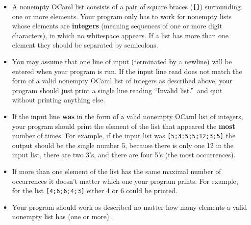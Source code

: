 \documentclass[11pt]{article}
\begin{document}
\begin{enumerate}
          \vspace{-2.5mm}

          \begin{itemize}

            \addtolength{\itemsep}{0mm}

            \item A nonempty OCaml list consists of a pair of square braces
                  (\texttt{[]}) surrounding one or more elements.  Your
                  program only has to work for nonempty lists whose elements
                  are \textbf{integers} (meaning sequences of one or more
                  digit characters), in which no whitespace appears.  If a
                  list has more than one element they should be separated by
                  semicolons.

            \item You may assume that one line of input (terminated by a
                  newline) will be entered when your program is run.  If the
                  input line read does not match the form of a valid
                  nonempty OCaml list of integers as described above, your
                  program should just print a single line reading ``Invalid
                  list.''\ and quit without printing anything else.

            \item If the input line \textbf{was} in the form of a valid
                  nonempty OCaml list of integers, your program should print
                  the element of the list that appeared the \textbf{most}
                  number of times.  For example, if the input list was
                  \texttt{[5;3;5;5;12;3;5]} the output should be the single
                  number 5, because there is only one 12 in the input list,
                  there are two 3's, and there are four 5's (the most
                  occurrences).

            \item If more than one element of the list has the same maximal
                  number of occurrences it doesn't matter which one your
                  program prints.  For example, for the list
                  \texttt{[4;6;6;4;3]} either 4 or 6 could be printed.

            \item Your program should work as described no matter how many
                  elements a valid nonempty list has (one or more).

          \end{itemize}


\end{enumerate}
\end{document}
